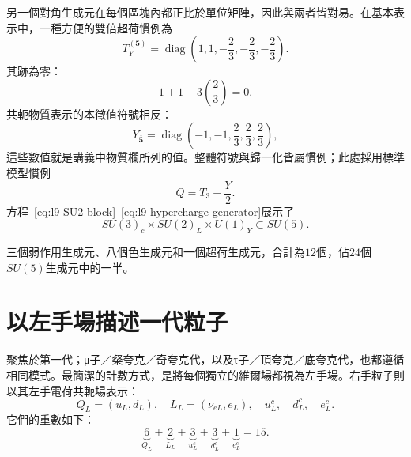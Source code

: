 另一個對角生成元在每個區塊內都正比於單位矩陣，因此與兩者皆對易。在基本表示中，一種方便的雙倍超荷慣例為
\begin{equation}
T_Y^{(\mathbf5)}=
\operatorname{diag}
\left(
1,1,-\frac23,-\frac23,-\frac23
\right).
\label{eq:l9-hypercharge-generator}
\end{equation}
其跡為零：
\begin{equation}
1+1-3\left(\frac23\right)=0.
\end{equation}
共軛物質表示的本徵值符號相反：
\begin{equation}
Y_{\overline{\mathbf5}}
=
\operatorname{diag}
\left(
-1,-1,\frac23,\frac23,\frac23
\right),
\label{eq:l9-fivebar-hypercharge}
\end{equation}
這些數值就是講義中物質欄所列的值。整體符號與歸一化皆屬慣例；此處採用標準模型慣例
\begin{equation}
Q=T_3+\frac{Y}{2}.
\label{eq:l9-charge}
\end{equation}
方程~\eqref{eq:l9-SU2-block}--\eqref{eq:l9-hypercharge-generator}展示了
\begin{equation}
SU(3)_c\times SU(2)_L\times U(1)_Y
\subset SU(5).
\end{equation}

三個弱作用生成元、八個色生成元和一個超荷生成元，合計為\(12\)個，佔\(24\)個\(SU(5)\)生成元中的一半。

\begin{classroomqa}
\end{classroomqa}

\section{以左手場描述一代粒子}

聚焦於第一代；{\proseunicodefont μ}子／粲夸克／奇夸克代，以及{\proseunicodefont τ}子／頂夸克／底夸克代，也都遵循相同模式。最簡潔的計數方式，是將每個獨立的維爾場都視為左手場。右手粒子則以其左手電荷共軛場表示：
\begin{equation}
Q_L=(u_L,d_L),\quad
L_L=(\nu_{eL},e_L),\quad
u^c_L,\quad d^c_L,\quad e^c_L.
\end{equation}
它們的重數如下：
\begin{equation}
\underbrace{6}_{Q_L}
+
\underbrace{2}_{L_L}
+
\underbrace{3}_{u^c_L}
+
\underbrace{3}_{d^c_L}
+
\underbrace{1}_{e^c_L}
=15.
\label{eq:l9-fifteen-fields}
\end{equation}

